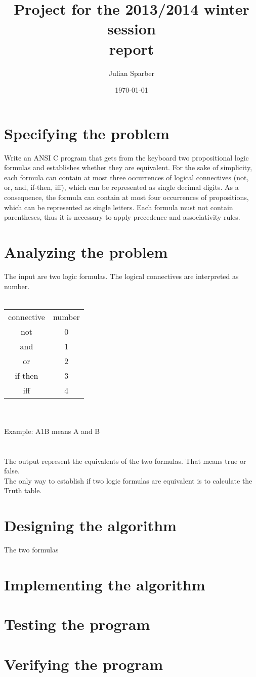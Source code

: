 \documentclass[11pt, a4paper, titlepage, block]{article}
\title{\textbf{Project for the 2013/2014 winter session\\ report}}
\author{Julian Sparber}
\date{\today}
\begin{document}
\maketitle
\section{Specifying the problem}
	Write an ANSI C program that gets from the keyboard two propositional logic formulas and
	establishes whether they are equivalent. For the sake of simplicity, each formula can contain at
	most three occurrences of logical connectives (not, or, and, if-then, iff), which can be represented
	as single decimal digits. As a consequence, the formula can contain at most four occurrences of
	propositions, which can be represented as single letters. Each formula must not contain parentheses,
	thus it is necessary to apply precedence and associativity rules.
	\newpage
\section{Analyzing the problem}
	The input are two logic formulas. The logical connectives are interpreted as number. \\
	\\
	\begin{tabular}{cc}
	connective & number\\
		not & 0\\
		and & 1\\
		or & 2\\
		if-then & 3\\
		iff & 4\\
	\end{tabular}\\
	\\
	Example: A1B means A and B\\
	\\ 
	\\
	The output represent the equivalents of the two formulas. That means true or false.\\
	The only way to establish if two logic formulas are equivalent is to calculate the Truth table.
	\newpage			
\section{Designing the algorithm}
	The two formulas
	\newpage
\section{Implementing the algorithm}


	\newpage
\section{Testing the program}
	\newpage
\section{Verifying the program}
\end{document}
